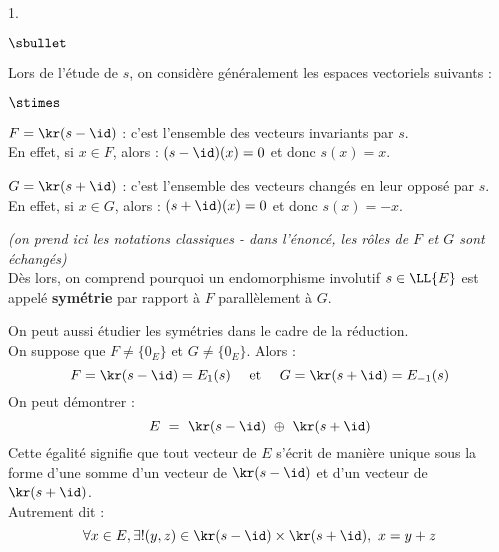 \begin{noliste}{1.}
\begin{remark}
\begin{noliste}{$\sbullet$}
  \item Lors de l'étude de $s$, on considère généralement les espaces
    vectoriels suivants :
    \begin{noliste}{$\stimes$}
    \item $F = \kr(s - \id)$ : c'est l'ensemble des vecteurs
      invariants par $s$.\\
      En effet, si $x \in F$, alors : $(s - \id)(x) = 0$ et donc $s(x)
      = x$.
    \item $G = \kr(s + \id)$ : c'est l'ensemble des vecteurs changés
      en leur opposé par $s$.\\
      En effet, si $x \in G$, alors : $(s + \id)(x) = 0$ et donc $s(x)
      = -x$.      
    \end{noliste}
    {\it (on prend ici les notations classiques - dans l'énoncé, les
      rôles de $F$ et $G$ sont échangés)}\\[.2cm]
    Dès lors, on comprend pourquoi un endomorphisme involutif $s \in
    \LL{E}$ est appelé {\bf symétrie} par rapport à $F$ parallèlement
    à $G$.
  \item On peut aussi étudier les symétries dans le cadre de la
    réduction.\\
    On suppose que $F \neq \{ 0_E \}$ et $G \neq \{ 0_E \}$. Alors : 
    \[
    F = \kr(s - \id) = E_{1}(s) \quad \text{ et } \quad G = \kr(s +
    \id) = E_{-1}(s)
    \]
    On peut démontrer : 
    \[
    E \ = \ \kr(s - \id) \ \oplus \ \kr(s + \id)
    \]
    Cette égalité signifie que tout vecteur de $E$ s'écrit de manière
    unique sous la forme d'une somme d'un vecteur de $\kr(s - \id)$ et
    d'un vecteur de $\kr(s + \id)$.\\
    Autrement dit :
    \[
    \forall x \in E, \exists ! (y, z) \in \kr(s - \id) \times \kr(s +
    \id), \ x = y + z
    \]

\end{noliste}
\end{remark}
\end{noliste}

